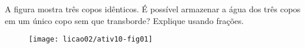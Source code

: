 \begin{atividade}{}\label{chap2-ativ10}
A figura mostra três copos idênticos.  É possível armazenar a água dos três copos em um único copo sem que transborde? Explique usando frações.









\begin{figure}[H]
\centering

\texttt{[image: licao02/ativ10-fig01]}
\end{figure}
\end{atividade}

